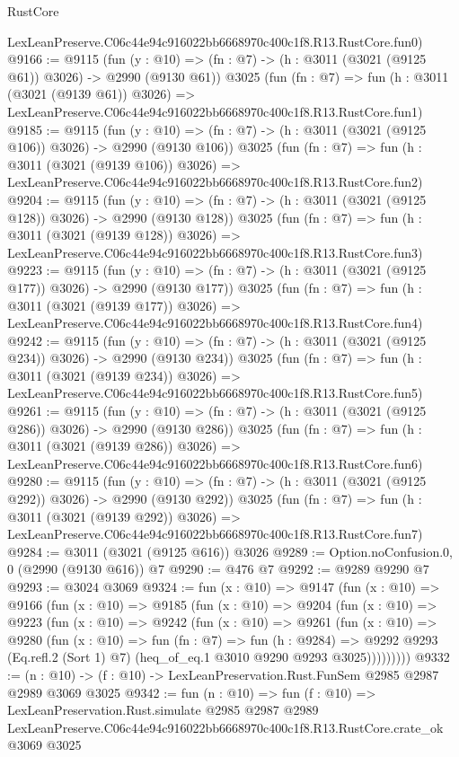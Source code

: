 \begin{lexlean}{RustCore}
\begin{coremodule}
    LexLeanPreserve.C06c44e94c916022bb6668970c400c1f8.R13.RustCore.fun0)
@9166 := @9115
    (fun (y : @10) => (fn : @7) -> (h : @3011 (@3021 (@9125 @61)) @3026) -> @2990 (@9130 @61))
    @3025
    (fun (fn : @7) =>
    fun (h : @3011 (@3021 (@9139 @61)) @3026) =>
    LexLeanPreserve.C06c44e94c916022bb6668970c400c1f8.R13.RustCore.fun1)
@9185 := @9115
    (fun (y : @10) => (fn : @7) -> (h : @3011 (@3021 (@9125 @106)) @3026) -> @2990 (@9130 @106))
    @3025
    (fun (fn : @7) =>
    fun (h : @3011 (@3021 (@9139 @106)) @3026) =>
    LexLeanPreserve.C06c44e94c916022bb6668970c400c1f8.R13.RustCore.fun2)
@9204 := @9115
    (fun (y : @10) => (fn : @7) -> (h : @3011 (@3021 (@9125 @128)) @3026) -> @2990 (@9130 @128))
    @3025
    (fun (fn : @7) =>
    fun (h : @3011 (@3021 (@9139 @128)) @3026) =>
    LexLeanPreserve.C06c44e94c916022bb6668970c400c1f8.R13.RustCore.fun3)
@9223 := @9115
    (fun (y : @10) => (fn : @7) -> (h : @3011 (@3021 (@9125 @177)) @3026) -> @2990 (@9130 @177))
    @3025
    (fun (fn : @7) =>
    fun (h : @3011 (@3021 (@9139 @177)) @3026) =>
    LexLeanPreserve.C06c44e94c916022bb6668970c400c1f8.R13.RustCore.fun4)
@9242 := @9115
    (fun (y : @10) => (fn : @7) -> (h : @3011 (@3021 (@9125 @234)) @3026) -> @2990 (@9130 @234))
    @3025
    (fun (fn : @7) =>
    fun (h : @3011 (@3021 (@9139 @234)) @3026) =>
    LexLeanPreserve.C06c44e94c916022bb6668970c400c1f8.R13.RustCore.fun5)
@9261 := @9115
    (fun (y : @10) => (fn : @7) -> (h : @3011 (@3021 (@9125 @286)) @3026) -> @2990 (@9130 @286))
    @3025
    (fun (fn : @7) =>
    fun (h : @3011 (@3021 (@9139 @286)) @3026) =>
    LexLeanPreserve.C06c44e94c916022bb6668970c400c1f8.R13.RustCore.fun6)
@9280 := @9115
    (fun (y : @10) => (fn : @7) -> (h : @3011 (@3021 (@9125 @292)) @3026) -> @2990 (@9130 @292))
    @3025
    (fun (fn : @7) =>
    fun (h : @3011 (@3021 (@9139 @292)) @3026) =>
    LexLeanPreserve.C06c44e94c916022bb6668970c400c1f8.R13.RustCore.fun7)
@9284 := @3011 (@3021 (@9125 @616)) @3026
@9289 := Option.noConfusion.{0, 0} (@2990 (@9130 @616)) @7
@9290 := @476 @7
@9292 := @9289 @9290 @7
@9293 := @3024 @3069
@9324 := fun (x : @10) =>
  @9147
    (fun (x : @10) =>
    @9166
      (fun (x : @10) =>
      @9185
        (fun (x : @10) =>
        @9204
          (fun (x : @10) =>
          @9223
            (fun (x : @10) =>
            @9242
              (fun (x : @10) =>
              @9261
                (fun (x : @10) =>
                @9280
                  (fun (x : @10) =>
                  fun (fn : @7) =>
                  fun (h : @9284) =>
                  @9292
                    @9293
                    (Eq.refl.{2} (Sort 1) @7)
                    (heq_of_eq.{1} @3010 @9290 @9293 @3025)))))))))
@9332 := (n : @10) -> (f : @10) -> LexLeanPreservation.Rust.FunSem @2985 @2987 @2989 @3069 @3025
@9342 := fun (n : @10) =>
  fun (f : @10) =>
  LexLeanPreservation.Rust.simulate
    @2985
    @2987
    @2989
    LexLeanPreserve.C06c44e94c916022bb6668970c400c1f8.R13.RustCore.crate_ok
    @3069
    @3025
\end{coremodule}
\end{lexlean}
